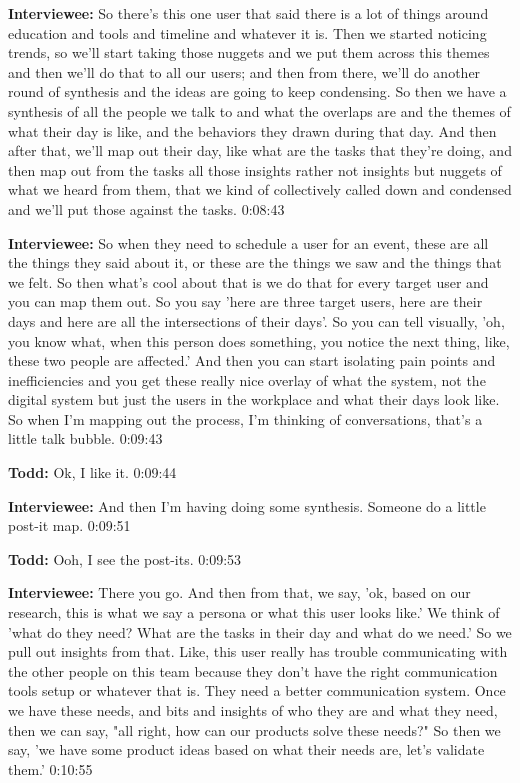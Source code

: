 \textbf{Interviewee:} So there's this one user that said there is a lot of things around education and tools and timeline and whatever it is.  Then we started noticing trends, so we'll start taking those nuggets and we put them across this themes and then we'll do that to all our users; and then from there, we'll do another round of synthesis and the ideas are going to keep condensing.  So then we have a synthesis of all the people we talk to and what the overlaps are and the themes of what their day is like, and the behaviors they drawn during that day.  And then after that, we'll map out their day, like what are the tasks that they're doing, and then map out from the tasks all those insights rather not insights but nuggets of what we heard from them, that we kind of collectively called down and condensed and we'll put those against the tasks.    0:08:43

\textbf{Interviewee:} So when they need to schedule a user for an event, these are all the things they said about it, or these are the things we saw and the things that we felt.  So then what's cool about that is we do that for every target user and you can map them out.  So you say 'here are three target users, here are their days and here are all the intersections of their days'.   So you can tell visually, 'oh, you know what, when this person does something, you notice the next thing, like, these two people are affected.' And then you can start isolating pain points and inefficiencies and you get these really nice overlay of what the system, not the digital system but just the users in the workplace and what their days look like.  So when I'm mapping out the process, I'm thinking of conversations, that's a little talk bubble.  0:09:43

\textbf{Todd:} Ok, I like it.  0:09:44

\textbf{Interviewee:} And then I'm having doing some synthesis. Someone do a little post-it map.  0:09:51

\textbf{Todd:} Ooh, I see the post-its.  0:09:53

\textbf{Interviewee:} There you go.  And then from that, we say, 'ok, based on our research, this is what we say a persona or what this user looks like.'  We think of 'what do they need? What are the tasks in their day and what do we need.'  So we pull out insights from that. Like, this user really has trouble communicating with the other people on this team because they don't have the right communication tools setup or whatever that is. They need a better communication system.  Once we have these needs, and bits and insights of who they are and what they need, then we can say, "all right, how can our products solve these needs?" So then we say, 'we have some product ideas based on what their needs are, let's validate them.'   0:10:55

